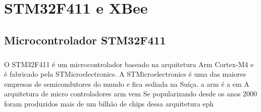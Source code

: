 \chapter{STM32F411 e XBee}
\noindent

\section{Microcontrolador STM32F411}
\paragraph{} O STM32F411 é um microcontrolador baseado na arquitetura Arm Cortex-M4 e é fabricado pela STMicroelectronics. A STMicroelectronics é uma das maiores empresas de semicondutores do mundo e fica sediada na Suíça. 
a arm é a em
A arquitetura de micro controladores arm vem Se popularizando desde os anos 2000 
 foram produzidos mais de um bilhão de chips dessa arquitetura eph{} 



\paragraph{}
